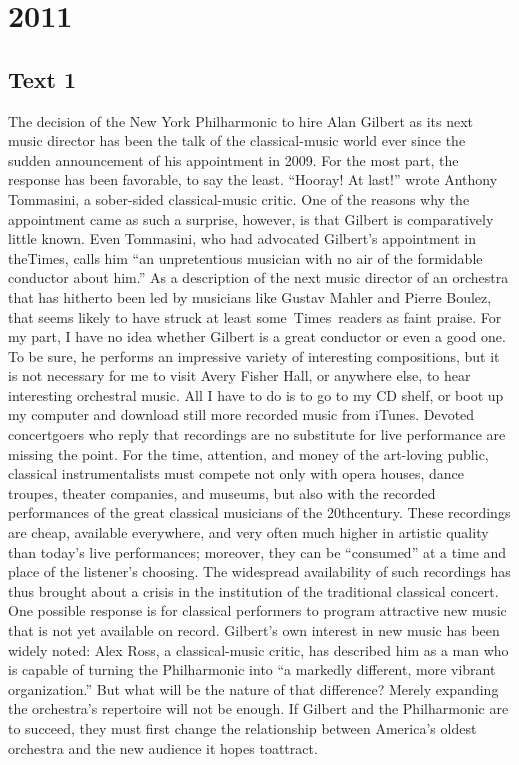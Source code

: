 
 \section{2011}
 \subsection{Text 1}
 The decision of the New York Philharmonic to hire Alan
 Gilbert as its next music director has been the talk of the classical-music world ever since the sudden announcement of his appointment in 2009. For the most part, the response has been favorable, to say the least. “Hooray! At last!” wrote Anthony Tommasini, a sober-sided classical-music critic.
 One of the reasons why the appointment came as such a surprise, however, is that Gilbert is comparatively little known. Even Tommasini, who had advocated Gilbert’s appointment in theTimes, calls him “an unpretentious musician with no air of the formidable conductor about him.” As a description of the next music director of an orchestra that has hitherto been led by musicians like Gustav Mahler and Pierre Boulez, that seems likely to have struck at least some Times readers as faint praise.
 For my part, I have no idea whether Gilbert is a great conductor or even a good one. To be sure, he performs an impressive variety of interesting compositions, but it is not necessary for me to visit Avery Fisher Hall, or anywhere else, to hear interesting orchestral music. All I have to do is to go to my CD shelf, or boot up my computer and download still more recorded music from iTunes.
 Devoted concertgoers who reply that recordings are no substitute for live performance are missing the point. For the time, attention, and money of the art-loving public, classical instrumentalists must compete not only with opera houses, dance troupes, theater companies, and museums, but also with the recorded performances of the great classical musicians of the 20thcentury. These recordings are cheap, available everywhere, and very often much higher in artistic quality than today’s live performances; moreover, they can be “consumed” at a time and place of the listener’s choosing. The widespread availability of such recordings has thus brought about a crisis in the institution of the traditional classical concert.
 One possible response is for classical performers to program attractive new music that is not yet available on record. Gilbert’s own interest in new music has been widely noted: Alex Ross, a classical-music critic, has described him as a man who is capable of turning the Philharmonic into “a markedly different, more vibrant organization.” But what will be the nature of that difference? Merely expanding the orchestra’s repertoire will not be enough. If Gilbert and the Philharmonic are to succeed, they must first change the relationship between America’s oldest orchestra and the new audience it hopes toattract.

